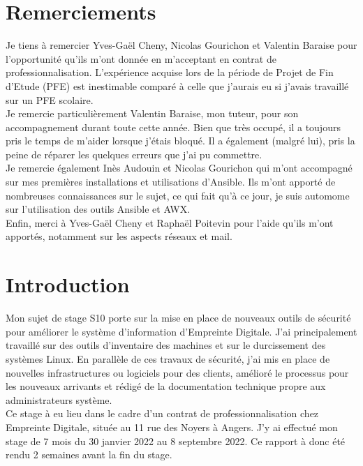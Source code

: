 \documentclass[12pt]{article}
\begin{document}
\newpage
\section*{Remerciements}
Je tiens à remercier Yves-Gaël Cheny, Nicolas Gourichon et Valentin Baraise pour l'opportunité qu'ils m'ont donnée en m'acceptant en contrat de professionnalisation. 
L'expérience acquise lors de la période de Projet de Fin d'Etude (\gls{PFE}) est inestimable comparé à celle que j'aurais eu si j'avais travaillé sur un \gls{PFE} scolaire. \\

Je remercie particulièrement Valentin Baraise, mon tuteur, pour son accompagnement durant toute cette année. 
Bien que très occupé, il a toujours pris le temps de m'aider lorsque j'étais bloqué. 
Il a également (malgré lui), pris la peine de réparer les quelques erreurs que j'ai pu commettre. \\

Je remercie également Inès Audouin et Nicolas Gourichon qui m'ont accompagné sur mes premières installations et utilisations d'\gls{Ansible}. 
Ils m'ont apporté de nombreuses connaissances sur le sujet, ce qui fait qu'à ce jour, je suis automome sur l'utilisation des outils \gls{Ansible} et AWX. \\

Enfin, merci à Yves-Gaël Cheny et Raphaël Poitevin pour l'aide qu'ils m'ont apportés, notamment sur les aspects réseaux et mail.


\newpage
\tableofcontents

\newpage
\section*{Introduction}
Mon sujet de stage S10 porte sur la mise en place de nouveaux outils de sécurité pour améliorer le système d'information d'Empreinte Digitale. 
J'ai principalement travaillé sur des outils d'inventaire des machines et sur le durcissement des systèmes \gls{Linux}. 
En parallèle de ces travaux de sécurité, j'ai mis en place de nouvelles infrastructures ou logiciels pour des clients, amélioré le processus pour les nouveaux arrivants et rédigé de la documentation technique propre aux administrateurs système. \\

Ce stage à eu lieu dans le cadre d'un contrat de professionnalisation chez Empreinte Digitale, située au 11 rue des Noyers à Angers. 
J'y ai effectué mon stage de 7 mois du 30 janvier 2022 au 8 septembre 2022. 
Ce rapport à donc été rendu 2 semaines avant la fin du stage. \\
\end{document}
